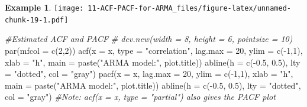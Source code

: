 \documentclass[
]{book}
\newenvironment{Shaded}{\begin{snugshade}}{\end{snugshade}}
\newcommand{\AttributeTok}[1]{\textcolor[rgb]{0.77,0.63,0.00}{#1}}
\newcommand{\CommentTok}[1]{\textcolor[rgb]{0.56,0.35,0.01}{\textit{#1}}}
\newcommand{\DecValTok}[1]{\textcolor[rgb]{0.00,0.00,0.81}{#1}}
\newcommand{\FloatTok}[1]{\textcolor[rgb]{0.00,0.00,0.81}{#1}}
\newcommand{\FunctionTok}[1]{\textcolor[rgb]{0.00,0.00,0.00}{#1}}
\newcommand{\NormalTok}[1]{#1}
\newcommand{\SpecialCharTok}[1]{\textcolor[rgb]{0.00,0.00,0.00}{#1}}
\newcommand{\StringTok}[1]{\textcolor[rgb]{0.31,0.60,0.02}{#1}}
\theoremstyle{definition}
\theoremstyle{definition}
\newtheorem{example}{Example}[chapter]
\theoremstyle{definition}
\theoremstyle{definition}
\theoremstyle{remark}
\begin{document}
\begin{example}
\texttt{[image: 11-ACF-PACF-for-ARMA\_files/figure-latex/unnamed-chunk-19-1.pdf]}

\begin{Shaded}
\begin{Highlighting}[]
\CommentTok{\#Estimated ACF and PACF}
  \CommentTok{\# dev.new(width = 8, height = 6, pointsize = 10)}
  \FunctionTok{par}\NormalTok{(}\AttributeTok{mfcol =} \FunctionTok{c}\NormalTok{(}\DecValTok{2}\NormalTok{,}\DecValTok{2}\NormalTok{))}
  \FunctionTok{acf}\NormalTok{(}\AttributeTok{x =}\NormalTok{ x, }\AttributeTok{type =} \StringTok{"correlation"}\NormalTok{, }\AttributeTok{lag.max =} \DecValTok{20}\NormalTok{, }\AttributeTok{ylim =} \FunctionTok{c}\NormalTok{(}\SpecialCharTok{{-}}\DecValTok{1}\NormalTok{,}\DecValTok{1}\NormalTok{), }\AttributeTok{xlab =} \StringTok{"h"}\NormalTok{,}
    \AttributeTok{main =} \FunctionTok{paste}\NormalTok{(}\StringTok{"ARMA model:"}\NormalTok{, plot.title))}
  \FunctionTok{abline}\NormalTok{(}\AttributeTok{h =} \FunctionTok{c}\NormalTok{(}\SpecialCharTok{{-}}\FloatTok{0.5}\NormalTok{, }\FloatTok{0.5}\NormalTok{), }\AttributeTok{lty =} \StringTok{"dotted"}\NormalTok{, }\AttributeTok{col =} \StringTok{"gray"}\NormalTok{)}
  \FunctionTok{pacf}\NormalTok{(}\AttributeTok{x =}\NormalTok{ x, }\AttributeTok{lag.max =} \DecValTok{20}\NormalTok{, }\AttributeTok{ylim =} \FunctionTok{c}\NormalTok{(}\SpecialCharTok{{-}}\DecValTok{1}\NormalTok{,}\DecValTok{1}\NormalTok{), }\AttributeTok{xlab =} \StringTok{"h"}\NormalTok{,}
    \AttributeTok{main =} \FunctionTok{paste}\NormalTok{(}\StringTok{"ARMA model:"}\NormalTok{, plot.title))}
  \FunctionTok{abline}\NormalTok{(}\AttributeTok{h =} \FunctionTok{c}\NormalTok{(}\SpecialCharTok{{-}}\FloatTok{0.5}\NormalTok{, }\FloatTok{0.5}\NormalTok{), }\AttributeTok{lty =} \StringTok{"dotted"}\NormalTok{, }\AttributeTok{col =} \StringTok{"gray"}\NormalTok{)}
  \CommentTok{\#Note: acf(x = x, type = "partial") also gives the PACF plot}
  

\end{Highlighting}
\end{Shaded}
\end{example}
\end{document}
